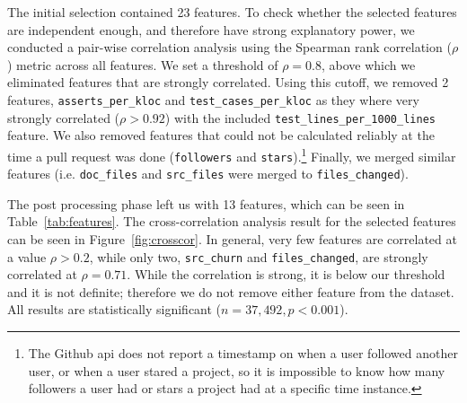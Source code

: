 \documentclass{acm_proc_article-sp}
\begin{document}
The initial selection contained 23 features. To check whe\-ther the selected
features are independent enough, and therefore have strong explanatory power, we
conducted a pair-wise correlation analysis using the Spearman rank correlation
($\rho$) metric across all features. We set a threshold of $\rho = 0.8$, above
which we eliminated features that are strongly correlated. Using this cutoff, we
removed 2 features, \texttt{asserts\_per\_kloc} and
\texttt{test\_cases\_per\_kloc} as they where very strongly correlated ($\rho >
0.92$) with the included \texttt{test\_lines\_per\_1000\_lines} feature. We also
removed features that could not be calculated reliably at the time a pull
request was done (\texttt{followers} and \texttt{stars}).\footnote{The Github
{\sc api} does not report a timestamp on when a user followed another user, or
when a user stared a project, so it is impossible to know how many followers a
user had or stars a project had at a specific time instance.} Finally, we
merged similar features (i.e. \texttt{doc\_files} and \texttt{src\_files} were merged to \texttt{files\_changed}). 

The post processing phase left us with
13 features, which can be seen in Table~\ref{tab:features}.
The cross-correlation analysis result for the selected features can be seen in
Figure~\ref{fig:crosscor}. In general, very few features are correlated at a
value $\rho > 0.2$, while only two, \texttt{src\_churn} and
\texttt{files\_changed}, are strongly correlated at $\rho = 0.71$. While the
correlation is strong, it is below our threshold and it is not definite;
therefore we do not remove either feature from the dataset. All results are
statistically significant ($n = 37,492, p < 0.001$).
\end{document}

